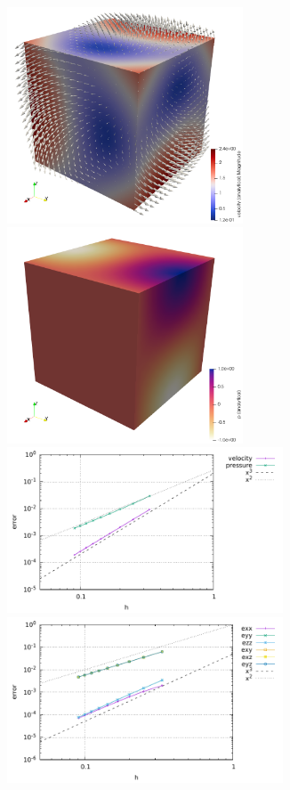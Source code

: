 \begin{center}
\includegraphics[width=7cm]{python_codes/fieldstone_17/experiment2/vel}
\includegraphics[width=7cm]{python_codes/fieldstone_17/experiment2/press}\\
\includegraphics[width=8.2cm]{python_codes/fieldstone_17/experiment2/errors.pdf}
\includegraphics[width=8.2cm]{python_codes/fieldstone_17/experiment2/errors_sr.pdf}
\end{center}















